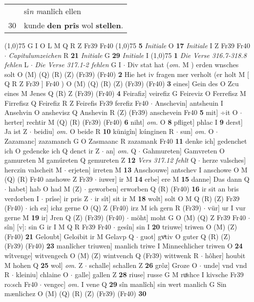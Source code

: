 \documentclass[8pt,a4paper,notitlepage]{article}
\begin{document}
\begin{table}[ht]
\begin{minipage}[t]{0.5\linewidth}
\begin{tabular}{rl}
 & sî\textit{n} \textit{m}anlîch ellen\\ 
30 & kunde \textbf{den prîs} wol \textbf{stellen}.\\ 
\end{tabular}
\scriptsize
\line(1,0){75} \newline
G I O L M Q R Z Fr39 Fr40 \newline
\line(1,0){75} \newline
\textbf{5} \textit{Initiale} O  \textbf{17} \textit{Initiale} I Z Fr39 Fr40   $\cdot$ \textit{Capitulumzeichen} R  \textbf{21} \textit{Initiale} G  \textbf{29} \textit{Initiale} I  \newline
\line(1,0){75} \newline
\textbf{1} \textit{Die Verse 316.7-318.8 fehlen} L   $\cdot$ \textit{Die Verse 317.1-2 fehlen} G I   $\cdot$ Div stat hat (\textit{om.} M ) erden wnsches solt O (M) (Q) (R) (Z) (Fr39) (Fr40) \textbf{2} Hie het iv fragen mer verholt (er holt M [ Q R Z Fr39 ] Fr40 ) O (M) (Q) (R) (Z) (Fr39) (Fr40) \textbf{3} eines] Gein des O Zcu eines M Jenes Q (R) Z (Fr39) (Fr40) \textbf{4} Feirafiz] veirefiz G Feireviz O Ferrefisz M Firrefisz Q Feirefiz R Z Feirefis Fr39 ferefiz Fr40  $\cdot$ Anschevin] antsheuin I Ansehvin O anshevisz Q Anshevin R (Z) (Fr39) anschevein Fr40 \textbf{5} mit] ÷it O  $\cdot$ herter] rechtir M (Q) (R) (Fr39) (Fr40) \textbf{6} niht] \textit{om.} O \textbf{8} pfliget] phlac I \textbf{9} derst] Ja ist Z  $\cdot$ beidiu] \textit{om.} O beide R \textbf{10} künigîn] kúnginen R  $\cdot$ sun] \textit{om.} O  $\cdot$ Zazamanc] zazamanch G O Zasmaanc R zazamank Fr40 \textbf{11} denke ich] gedenchet ich O gedencke ich Q denct ir Z  $\cdot$ an] \textit{om.} Q  $\cdot$ Gahmureten] Gamvreten O gamureten M gamúreten Q gemureten Z \textbf{12} \textit{Vers 317.12 fehlt} Q   $\cdot$ herze valsches] herczin valscheit M  $\cdot$ erjeten] irreten M \textbf{13} Anschouwe] antschev I anschowe O M (Q) (R) Fr40 anshowe Z Fr39  $\cdot$ iuwer] ir M \textbf{14} erbe] ere M \textbf{15} danne] Das dann Q  $\cdot$ habet] hab O had M (Z)  $\cdot$ geworben] erworben Q (R) (Fr40) \textbf{16} ir sit an bris verdorben I  $\cdot$ prîse] ir pris Z  $\cdot$ ir sît] sit ir M \textbf{18} wolt] solt O M Q (R) (Z) Fr39 (Fr40)  $\cdot$ ich ez] ichz gerne O (Q) Z (Fr40) irz M ich gern R (Fr39)  $\cdot$ vür] ur I vur gerne M \textbf{19} ir] Jren Q (Z) (Fr39) (Fr40)  $\cdot$ möht] moht G O (M) (Q) Z Fr39 Fr40  $\cdot$ sîn] [v]: sin G ir I M Q R Fr39 Fr40  $\cdot$ gesîn] sin I \textbf{20} triuwe] triwen O (M) (Z) (Fr40) \textbf{21} Geloubt] Geloibit ir M Gelavp Q  $\cdot$ guot] gvͦtiv O guter Q (R) (Z) (Fr39) (Fr40) \textbf{23} manlîcher triuwen] manlich triwe I Minnechlicher triwen O \textbf{24} wîtvenge] witvengech O (M) (Z) wintvench Q (Fr39) wittwenk R  $\cdot$ hôher] houbit M hohen Q \textbf{25} wol] \textit{om.} Z  $\cdot$ schalle] schallen Z \textbf{26} grôz] Groze O  $\cdot$ unde] vnd vnd R  $\cdot$ kleiniu] chlaine O  $\cdot$ galle] gallen Z \textbf{28} riuse] russe G M ruͦshce I kivsche Fr39 ro:sch Fr40  $\cdot$ vengec] \textit{om.} I vene Q \textbf{29} sîn manlîch] sin wert manlich G Sin mænlichez O (M) (Q) (R) (Z) (Fr39) (Fr40) \textbf{30} 
\end{minipage}
\end{table}
\end{document}
